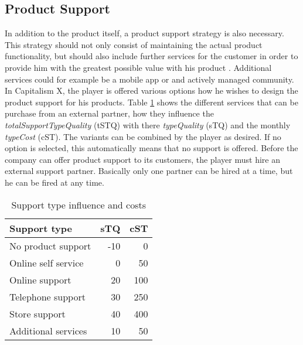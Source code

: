 \subsection{Product Support}  \label{product_support_simulation}

In addition to the product itself, a product support strategy is also necessary. This strategy should not only consist of maintaining the actual product functionality, but should also include further services for the customer in order to provide him with the greatest possible value with his product \cite{markeset_design_2003}. Additional services could for example be a mobile app or and actively managed community.  
In Capitalism X, the player is offered various options how he wishes to design the product support for his products. Table \ref{Support_types} shows the different services that can be purchase from an external partner, how they influence the \textit{totalSupportTypeQuality} (\gls{tSTQ}) with there \textit{typeQuality} (\gls{sTQ}) and the monthly \textit{typeCost} (\gls{cST}). The variants can be combined by the player as desired. If no option is selected, this automatically means that no support is offered.
Before the company can offer product support to its customers, the player must hire an external support partner. Basically only one partner can be hired at a time, but he can be fired at any time.\\

\begin{table}[ht]
    \centering
    \begin{tabular}{|l|r|r|}
    \hline
    Support type & sTQ & cST \\
    \hline
    No product support   & -10   & 0    \\
    Online self service  & 0     & 50   \\
    Online support       & 20    & 100  \\
    Telephone support    & 30    & 250  \\
    Store support        & 40    & 400  \\
    Additional services  & 10    & 50   \\     
    \hline
    \end{tabular}
    \caption{Support type influence and costs}
    \label{Support_types}
\end{table}

